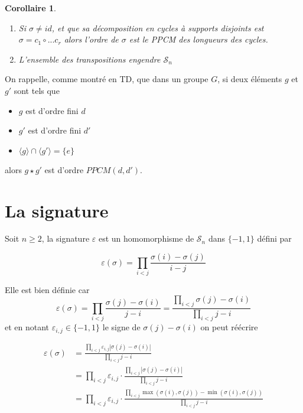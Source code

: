 \documentclass[]{article}
\newtheorem{mycor}{Corollaire}
\theoremstyle{remark}
\theoremstyle{definition}
\begin{document}
\begin{mycor}
	\leavevmode
	\begin{enumerate}
		\item Si $\sigma \neq id$, et que sa décomposition en cycles à supports disjoints est $\sigma = c_1 \circ ... c_r$ alors l'ordre de $\sigma$ est le PPCM des longueurs des cycles.
		
		\item L'ensemble des transpositions engendre $\mathscr{S}_n$
	\end{enumerate}
\end{mycor}

On rappelle, comme montré en TD, que dans un groupe $G$, si deux éléments $g$ et $g'$ sont tels que
\begin{itemize}
	\item $g$ est d'ordre fini $d$
	\item $g'$ est d'ordre fini $d'$
	\item $\langle g \rangle \cap \langle g' \rangle = \{e\}$
\end{itemize}

alors $g \star g'$ est d'ordre $PPCM(d, d')$.

\section{La signature}

Soit $n \geqslant 2$, la signature $\varepsilon$ est un homomorphisme de $\mathscr{S}_n$ dans $\{-1, 1\}$ défini par

$$\varepsilon(\sigma) = \prod_{i < j} \frac{\sigma(i) - \sigma(j)}{i - j}$$

Elle est bien définie car $$\varepsilon(\sigma) = \prod_{i < j} \frac{\sigma(j) - \sigma(i)}{j - i} = \frac{\displaystyle \prod_{i < j} \sigma(j) - \sigma(i)}{\displaystyle \prod_{i < j} j - i}$$ et en notant $\varepsilon_{i, j} \in \{-1, 1\}$ le signe de $\sigma(j) - \sigma(i)$ on peut réécrire

$$
\begin{aligned}
\varepsilon(\sigma) &= \frac{\displaystyle \prod_{i < j} \varepsilon_{i, j} |\sigma(j) - \sigma(i)|}{\displaystyle \prod_{i < j} j - i}\\
&=\prod_{i < j} \varepsilon_{i, j} \cdot \frac{\displaystyle \prod_{i < j} |\sigma(j) - \sigma(i)|}{\displaystyle \prod_{i < j} j - i} \\
&=\prod_{i < j} \varepsilon_{i, j} \cdot \frac{\displaystyle \prod_{i < j} \max(\sigma(i), \sigma(j)) - \min(\sigma(i), \sigma(j))}{\displaystyle \prod_{i < j} j - i}
\end{aligned}
$$
\end{document}
